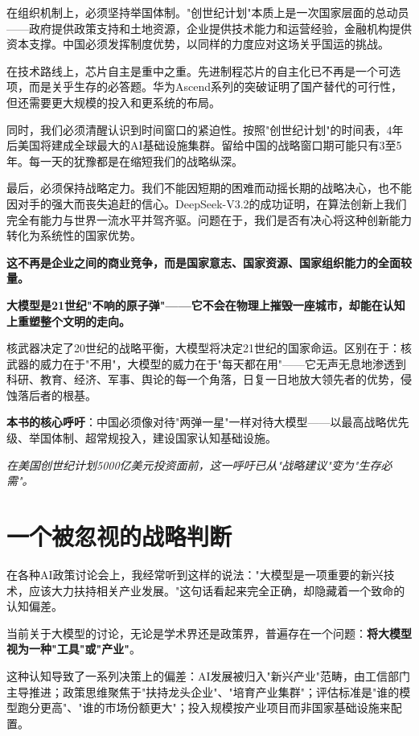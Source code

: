 在组织机制上，必须坚持举国体制。"创世纪计划"本质上是一次国家层面的总动员——政府提供政策支持和土地资源，企业提供技术能力和运营经验，金融机构提供资本支撑。中国必须发挥制度优势，以同样的力度应对这场关乎国运的挑战。

在技术路线上，芯片自主是重中之重。先进制程芯片的自主化已不再是一个可选项，而是关乎生存的必答题。华为Ascend系列的突破证明了国产替代的可行性，但还需要更大规模的投入和更系统的布局。

同时，我们必须清醒认识到时间窗口的紧迫性。按照"创世纪计划"的时间表，4年后美国将建成全球最大的AI基础设施集群。留给中国的战略窗口期可能只有3至5年。每一天的犹豫都是在缩短我们的战略纵深。

最后，必须保持战略定力。我们不能因短期的困难而动摇长期的战略决心，也不能因对手的强大而丧失追赶的信心。DeepSeek-V3.2的成功证明，在算法创新上我们完全有能力与世界一流水平并驾齐驱。问题在于，我们是否有决心将这种创新能力转化为系统性的国家优势。

\textbf{这不再是企业之间的商业竞争，而是国家意志、国家资源、国家组织能力的全面较量。}


\textbf{大模型是21世纪"不响的原子弹"——它不会在物理上摧毁一座城市，却能在认知上重塑整个文明的走向。}

核武器决定了20世纪的战略平衡，大模型将决定21世纪的国家命运。区别在于：核武器的威力在于"不用"，大模型的威力在于"每天都在用"——它无声无息地渗透到科研、教育、经济、军事、舆论的每一个角落，日复一日地放大领先者的优势，侵蚀落后者的根基。

\textbf{本书的核心呼吁}：中国必须像对待"两弹一星"一样对待大模型——以最高战略优先级、举国体制、超常规投入，建设国家认知基础设施。

\textit{在美国创世纪计划5000亿美元投资面前，这一呼吁已从"战略建议"变为"生存必需"。}

\section{一个被忽视的战略判断}

在各种AI政策讨论会上，我经常听到这样的说法："大模型是一项重要的新兴技术，应该大力扶持相关产业发展。"这句话看起来完全正确，却隐藏着一个致命的认知偏差。

当前关于大模型的讨论，无论是学术界还是政策界，普遍存在一个问题：\textbf{将大模型视为一种"工具"或"产业"}。

这种认知导致了一系列决策上的偏差：AI发展被归入"新兴产业"范畴，由工信部门主导推进；政策思维聚焦于"扶持龙头企业"、"培育产业集群"；评估标准是"谁的模型跑分更高"、"谁的市场份额更大"；投入规模按产业项目而非国家基础设施来配置。

